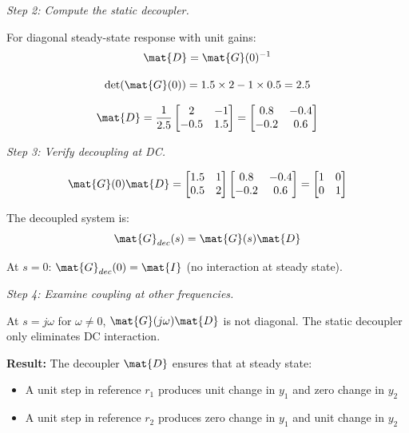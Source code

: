 \textit{Step 2: Compute the static decoupler.}

For diagonal steady-state response with unit gains:
\begin{equation}
\mat{D} = \mat{G}(0)^{-1}
\end{equation}

\begin{equation}
\det(\mat{G}(0)) = 1.5 \times 2 - 1 \times 0.5 = 2.5
\end{equation}

\begin{equation}
\mat{D} = \frac{1}{2.5}\begin{bmatrix} 2 & -1 \\ -0.5 & 1.5 \end{bmatrix}
= \begin{bmatrix} 0.8 & -0.4 \\ -0.2 & 0.6 \end{bmatrix}
\end{equation}

\textit{Step 3: Verify decoupling at DC.}

\begin{equation}
\mat{G}(0)\mat{D} = \begin{bmatrix} 1.5 & 1 \\ 0.5 & 2 \end{bmatrix}
\begin{bmatrix} 0.8 & -0.4 \\ -0.2 & 0.6 \end{bmatrix}
= \begin{bmatrix} 1 & 0 \\ 0 & 1 \end{bmatrix}
\end{equation}

The decoupled system is:
\begin{equation}
\mat{G}_{dec}(s) = \mat{G}(s)\mat{D}
\end{equation}

At $s = 0$: $\mat{G}_{dec}(0) = \mat{I}$ (no interaction at steady state).

\textit{Step 4: Examine coupling at other frequencies.}

At $s = j\omega$ for $\omega \neq 0$, $\mat{G}(j\omega)\mat{D}$ is not diagonal. The static decoupler only eliminates DC interaction.

\textbf{Result:} The decoupler $\mat{D}$ ensures that at steady state:
\begin{itemize}
    \item A unit step in reference $r_1$ produces unit change in $y_1$ and zero change in $y_2$
    \item A unit step in reference $r_2$ produces zero change in $y_1$ and unit change in $y_2$
\end{itemize}

